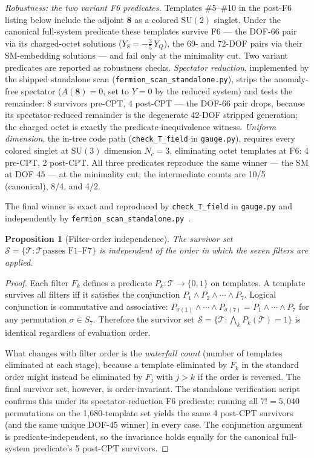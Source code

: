 \documentclass[11pt]{article}
\newtheorem{proposition}[theorem]{Proposition}
\theoremstyle{definition}
\newcommand{\SU}{\mathrm{SU}}
\begin{document}
\smallskip\noindent\textit{Robustness: the two variant F6 predicates.}\quad
Templates \#5--\#10 in the post-F6 listing below include the adjoint
$\mathbf{8}$ as a colored $\SU(2)$ singlet.  Under the canonical
full-system predicate these templates survive F6 --- the DOF-66 pair
via its charged-octet solutions ($Y_8 = -\tfrac{3}{5}\,Y_Q$), the 69-
and 72-DOF pairs via their SM-embedding solutions --- and fail only at
the minimality cut.  Two variant predicates are reported as robustness
checks.  \emph{Spectator reduction}, implemented by the shipped
standalone scan (\texttt{fermion\_scan\_standalone.py}), strips the
anomaly-free spectator ($A(\mathbf 8)=0$, set to $Y = 0$ by the
reduced system) and tests the remainder: 8 survivors pre-CPT, 4
post-CPT --- the DOF-66 pair drops, because its spectator-reduced
remainder is the degenerate 42-DOF stripped generation; the charged
octet is exactly the predicate-inequivalence witness.  \emph{Uniform
dimension}, the in-tree code path (\texttt{check\_T\_field} in
\texttt{gauge.py}), requires every colored singlet at $\SU(3)$
dimension $N_c = 3$, eliminating octet templates at F6: 4 pre-CPT, 2
post-CPT.  All three predicates reproduce the same winner --- the SM
at DOF 45 --- at the minimality cut; the intermediate counts are
10/5 (canonical), 8/4, and 4/2.

\smallskip\noindent The final winner is exact and reproduced by
\texttt{check\_T\_field} in \texttt{gauge.py} and independently by
\texttt{fermion\_scan\_standalone.py}~\cite{BrookeFermionScan}.

\begin{proposition}[Filter-order independence]\label{prop:filter_order}
The survivor set $\mathcal{S} = \{\mathcal{T} : \mathcal{T} \text{
passes F1--F7}\}$ is independent of the order in which the seven
filters are applied.
\end{proposition}

\begin{proof}
Each filter $F_k$ defines a predicate $P_k: \mathcal{T} \to
\{0, 1\}$ on templates.  A template survives all filters iff it
satisfies the conjunction $P_1 \wedge P_2 \wedge \cdots \wedge P_7$.
Logical conjunction is commutative and associative:
$P_{\sigma(1)} \wedge \cdots \wedge P_{\sigma(7)} = P_1 \wedge
\cdots \wedge P_7$ for any permutation $\sigma \in S_7$.  Therefore
the survivor set $\mathcal{S} = \{\mathcal{T} : \bigwedge_k
P_k(\mathcal{T}) = 1\}$ is identical regardless of evaluation order.

What changes with filter order is the \emph{waterfall count} (number
of templates eliminated at each stage), because a template eliminated
by $F_k$ in the standard order might instead be eliminated by
$F_j$ with $j > k$ if the order is reversed.  The final survivor
set, however, is order-invariant.  The standalone verification
script confirms this under its spectator-reduction F6 predicate:
running all $7! = 5{,}040$ permutations on the 1{,}680-template set
yields the same 4 post-CPT survivors (and the same unique DOF-45
winner) in every case.  The conjunction argument is
predicate-independent, so the invariance holds equally for the
canonical full-system predicate's 5 post-CPT survivors.
\end{proof}
\end{document}
